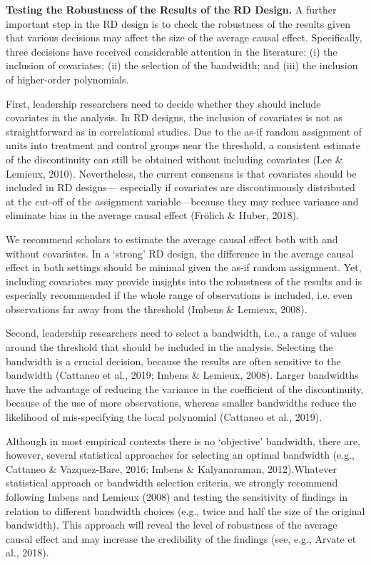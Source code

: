 \documentclass[english]{article}
\begin{document}
\noindent \textbf{Testing the Robustness of the Results of the RD
Design.} A further important step in the RD design is to check the robustness of
the results given that various decisions may affect the size of the
average causal effect. Specifically, three decisions have received
considerable attention in the literature: (i) the inclusion of
covariates; (ii) the selection of the bandwidth; and (iii) the inclusion
of higher-order polynomials.

First, leadership researchers need to decide whether they should include
covariates in the analysis. In RD designs, the inclusion of covariates
is not as straightforward as in correlational studies. Due to the as-if
random assignment of units into treatment and control groups near the
threshold, a consistent estimate of the discontinuity can still be
obtained without including covariates (Lee \& Lemieux, 2010).
Nevertheless, the current consensus is that covariates should be
included in RD designs--- especially if covariates are discontinuously
distributed at the cut-off of the assignment variable---because they may
reduce variance and eliminate bias in the average causal effect (Frölich
\& Huber, 2018).

We recommend scholars to estimate the average causal effect both with
and without covariates. In a `strong' RD design, the difference in the
average causal effect in both settings should be minimal given the as-if
random assignment. Yet, including covariates may provide insights into
the robustness of the results and is especially recommended if the whole
range of observations is included, i.e. even observations far away from
the threshold (Imbens \& Lemieux, 2008).

Second, leadership researchers need to select a bandwidth, i.e., a range
of values around the threshold that should be included in the analysis.
Selecting the bandwidth is a crucial decision, because the results are
often sensitive to the bandwidth (Cattaneo et al., 2019; Imbens \&
Lemieux, 2008). Larger bandwidths have the advantage of reducing the
variance in the coefficient of the discontinuity, because of the use of
more observations, whereas smaller bandwidths reduce the likelihood of
mis-specifying the local polynomial (Cattaneo et al., 2019).

Although in most empirical contexts there is no `objective' bandwidth,
there are, however, several statistical approaches for selecting an
optimal bandwidth (e.g., Cattaneo \& Vazquez-Bare, 2016; Imbens \&
Kalyanaraman, 2012).Whatever statistical approach or bandwidth selection
criteria, we strongly recommend following Imbens and Lemieux (2008) and
testing the sensitivity of findings in relation to different bandwidth
choices (e.g., twice and half the size of the original bandwidth). This
approach will reveal the level of robustness of the average causal
effect and may increase the credibility of the findings (see, e.g.,
Arvate et al., 2018).
\end{document}

